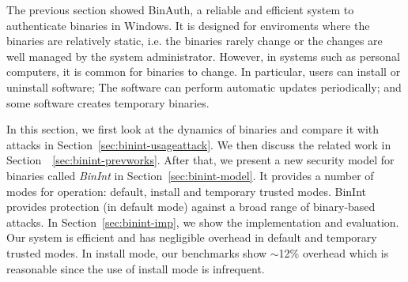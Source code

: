 
The previous section showed BinAuth, a reliable and efficient system
to authenticate binaries in Windows.
It is designed for enviroments where the binaries are relatively static,
i.e. the binaries rarely change or the changes are well managed by
the system administrator.
However, in systems such as personal computers, it is common for binaries
to change.
In particular, users can install or uninstall software;
The software can perform automatic updates periodically;
and some software creates temporary binaries.

In this section, we first look at the dynamics of binaries and compare
it with attacks in Section~\ref{sec:binint-usageattack}.
We then discuss the related work in Section~~\ref{sec:binint-prevworks}.
After that, we present a new security model for binaries called
{\em BinInt} in Section~\ref{sec:binint-model}.
It provides a number of modes for operation: default, install
and temporary trusted modes.
BinInt provides protection (in default mode) against a broad range of
binary-based attacks.
In Section~\ref{sec:binint-imp}, we show the implementation and evaluation.
Our system is efficient and has negligible overhead in default and temporary
trusted modes. 
In install mode, our benchmarks
show $\sim$12\% overhead which is reasonable since
the use of install mode is infrequent.
